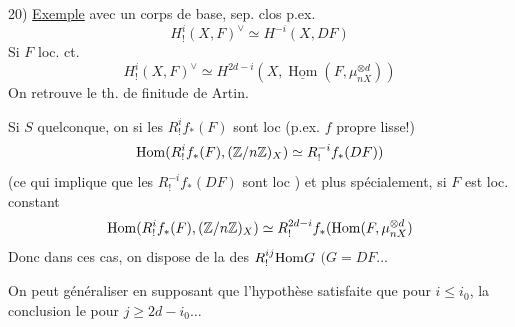 20) \uline{Exemple}  avec un corps de base, sep. clos p.ex.
\[
H^i_!(X,F)^\vee\simeq H^{-i}(X,DF)
\]
Si $F$ loc. ct.
\[
H^i_!(X,F)^\vee\simeq H^{2d-i}(X,\underline{\operatorname{Hom}}(F,\mu_{nX}^{\otimes d}))
\]
On retrouve le th. de finitude de Artin.

Si $S$ quelconque, on  si les $R^i_!f_*(F)$ sont loc  (p.ex. $f$ propre lisse!)
\[
\operatorname{Hom}(R^i_!f_*(F),(\mathbb Z/n\mathbb Z)_X)\simeq R^{-i}_{{{!}}}f_*(DF))
\]
(ce qui implique que les $R^{-i}_!f_*(DF)$ sont loc ) et plus spécialement, si $F$ est loc. constant
\[
\operatorname{Hom}(R^i_!f_*(F),(\mathbb Z/n\mathbb Z)_X)\simeq R^{2d-i}_{{{!}}}f_*(\operatorname{Hom}(F,\mu_{nX}^{\otimes d})
\]
Donc dans ces cas, on dispose de la  des $R^{{{i}}j}_{{{!}}}{\operatorname{Hom}}G$ $(G=DF\ldots$

On peut généraliser en supposant que l'hypothèse  satisfaite que pour $i\leq i_0$, la conclusion le  pour $j\geq2d-i_0\ldots$
